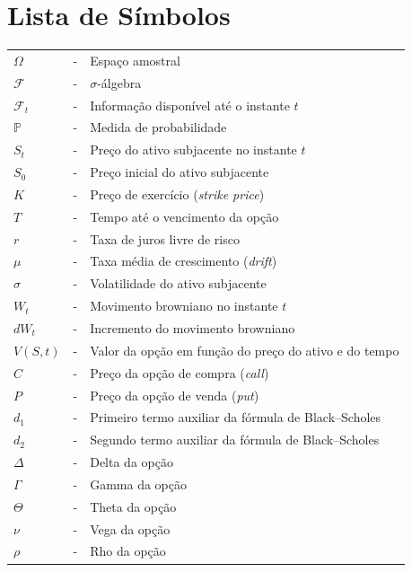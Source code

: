 \section*{Lista de Símbolos}

\singlespacing

\noindent
\begin{tabular}{l c p{.85\linewidth}}

$\Omega$ & - & Espaço amostral \\

$\mathcal{F}$ & - & $\sigma$-álgebra \\

$\mathcal{F}_t$ & - & Informação disponível até o instante $t$ \\

$\mathbb{P}$ & - & Medida de probabilidade \\

$S_t$ & - & Preço do ativo subjacente no instante $t$ \\

$S_0$ & - & Preço inicial do ativo subjacente \\

$K$ & - & Preço de exercício (\textit{strike price}) \\

$T$ & - & Tempo até o vencimento da opção \\

$r$ & - & Taxa de juros livre de risco \\

$\mu$ & - & Taxa média de crescimento (\textit{drift}) \\

$\sigma$ & - & Volatilidade do ativo subjacente \\

$W_t$ & - & Movimento browniano no instante $t$ \\

$dW_t$ & - & Incremento do movimento browniano \\

$V(S,t)$ & - & Valor da opção em função do preço do ativo e do tempo \\

$C$ & - & Preço da opção de compra (\textit{call}) \\

$P$ & - & Preço da opção de venda (\textit{put}) \\

$d_1$ & - & Primeiro termo auxiliar da fórmula de Black--Scholes \\

$d_2$ & - & Segundo termo auxiliar da fórmula de Black--Scholes \\

$\Delta$ & - & Delta da opção \\

$\Gamma$ & - & Gamma da opção \\

$\Theta$ & - & Theta da opção \\

$\nu$ & - & Vega da opção \\

$\rho$ & - & Rho da opção \\

\end{tabular}